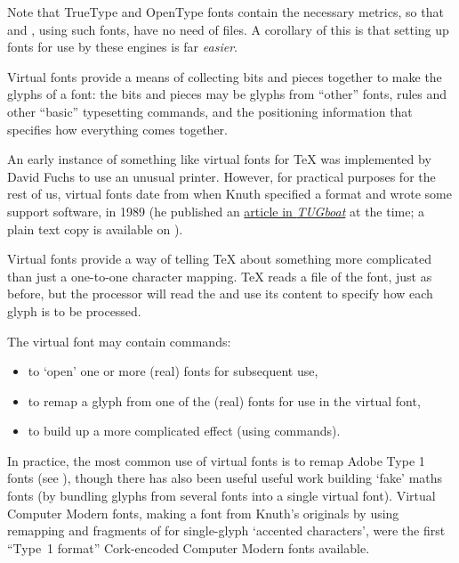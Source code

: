 Note that TrueType and OpenType fonts contain the necessary metrics,
so that  and , using
such fonts, have no need of  files.  A corollary of this is
that setting up fonts for use by these engines is far \emph{easier}.


Virtual fonts provide a means of collecting bits and pieces together
to make the glyphs of a font: the bits and pieces may be glyphs from
``other'' fonts, rules and other ``basic'' typesetting commands, and
the positioning information that specifies how everything comes
together.

An early instance of something like virtual fonts for \TeX{} was
implemented by David Fuchs to use an unusual printer.  However, for
practical purposes for the rest of us, virtual fonts date from when Knuth
specified a format and wrote some support software, in 1989 (he
published an %
\href{http://tug.org/TUGboat/tb11-1/tb27knut.pdf}{article in \textsl{TUGboat}}
at the time; a plain text copy is available on ).

Virtual fonts provide a way of telling \TeX{} about something more
complicated than just a one-to-one character mapping.  \TeX{} reads a
 file of the font, just as before, but the 
processor will read the  and use its content to specify how
each glyph is to be processed.

The virtual font may contain commands:
\begin{itemize}
\item to `open' one or more (real) fonts for subsequent use,
\item to remap a glyph from one of the (real) fonts for use in the
  virtual font,
\item to build up a more complicated effect (using  commands).
\end{itemize}

In practice, the most common use of virtual fonts is to remap
Adobe Type 1 fonts (see ),
though there has also been useful useful work building `fake' maths
fonts (by bundling glyphs from several fonts into a single virtual
font).  Virtual Computer Modern fonts, making a %
 font from Knuth's originals by using
remapping and fragments of  for single-glyph `accented
characters', were the first ``Type~1 format'' Cork-encoded Computer
Modern fonts available.

